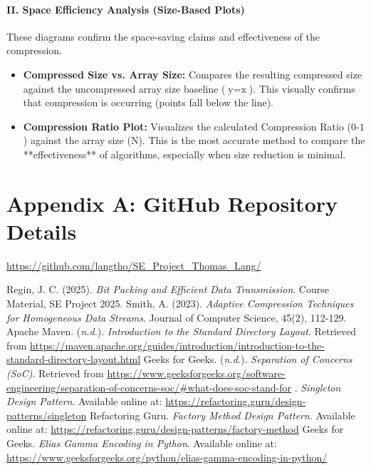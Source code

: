 \documentclass[11pt, a4paper]{article}
\begin{document}
	\paragraph{II. Space Efficiency Analysis (Size-Based Plots)}
	These diagrams confirm the space-saving claims and effectiveness of the compression.
	
	\begin{itemize}
		\item \textbf{Compressed Size vs. Array Size:} Compares the resulting compressed size against the uncompressed array size baseline ($\text{y} = \text{x}$). This visually confirms that compression is occurring (points fall below the line).
		
		\item \textbf{Compression Ratio Plot:} Visualizes the calculated Compression Ratio ($\text{0-1}$) against the array size ($\text{N}$). This is the most accurate method to compare the **effectiveness** of algorithms, especially when size reduction is minimal.
	\end{itemize}
	
	\section*{Appendix A: GitHub Repository Details}
	\url{https://github.com/langtho/SE_Project_Thomas_Lang/} %
	
	\begin{thebibliography}{99}
		 Regin, J. C. (2025). \textit{Bit Packing and Efficient Data Transmission}. Course Material, SE Project 2025.
		 Smith, A. (2023). \textit{Adaptive Compression Techniques for Homogeneous Data Streams}. Journal of Computer Science, 45(2), 112-129.
		 Apache Maven. (\textit{n.d.}). \textit{Introduction to the Standard Directory Layout}. Retrieved from \url{https://maven.apache.org/guides/introduction/introduction-to-the-standard-directory-layout.html}
		 Geeks for Geeks. (\textit{n.d.}). \textit{Separation of Concerns (SoC)}. Retrieved from \url{https://www.geeksforgeeks.org/software-engineering/separation-of-concerns-soc/#what-does-soc-stand-for}
		. \textit{Singleton Design Pattern}. Available online at: \url{https://refactoring.guru/design-patterns/singleton} 
		Refactoring Guru. \textit{Factory Method Design Pattern}. Available online at: \url{https://refactoring.guru/design-patterns/factory-method}
		 Geeks for Geeks. \textit{Elias Gamma Encoding in Python}. Available online at: \url{https://www.geeksforgeeks.org/python/elias-gamma-encoding-in-python/}
	\end{thebibliography}
\end{document}
